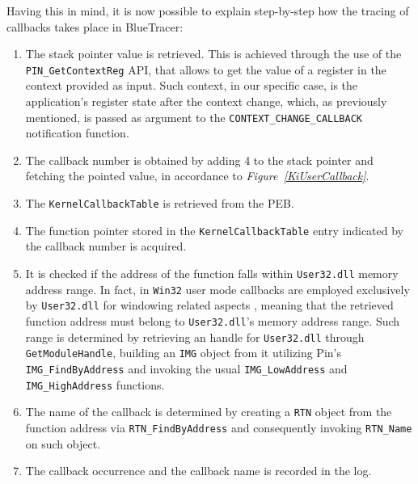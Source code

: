 Having this in mind, it is now possible to explain step-by-step how the tracing of callbacks takes place in BlueTracer:

\begin{enumerate}
\item The stack pointer value is retrieved. This is achieved through the use of the \texttt{PIN\_GetContextReg} API, that allows to get the value of a register in the context provided as input. Such context, in our specific case, is the application's register state after the context change, which, as previously mentioned, is passed as argument to the \texttt{CONTEXT\_CHANGE\_CALLBACK} notification function.
\item The callback number is obtained by adding 4 to the stack pointer and fetching the pointed value, in accordance to \textit{Figure~\ref{KiUserCallback}}.
\item The \texttt{KernelCallbackTable} is retrieved from the PEB. 
\item The function pointer stored in the \texttt{KernelCallbackTable} entry indicated by the callback number is acquired.
\item It is checked if the address of the function falls within \texttt{User32.dll} memory address range. In fact, in \texttt{Win32} user mode callbacks are employed exclusively by \texttt{User32.dll} for windowing related aspects \cite{UCDispatcher}, meaning that the retrieved function address must belong to \texttt{User32.dll}'s memory address range. Such range is determined by retrieving an handle for \texttt{User32.dll} through \texttt{GetModuleHandle}, building an \texttt{IMG} object from it utilizing Pin's \texttt{IMG\_FindByAddress} and invoking the usual \texttt{IMG\_LowAddress} and \texttt{IMG\_HighAddress} functions. 
\item The name of the callback is determined by creating a \texttt{RTN} object from the function address via \texttt{RTN\_FindByAddress} and consequently invoking \texttt{RTN\_Name} on such object.
\item The callback occurrence and the callback name is recorded in the log.
\end{enumerate}

